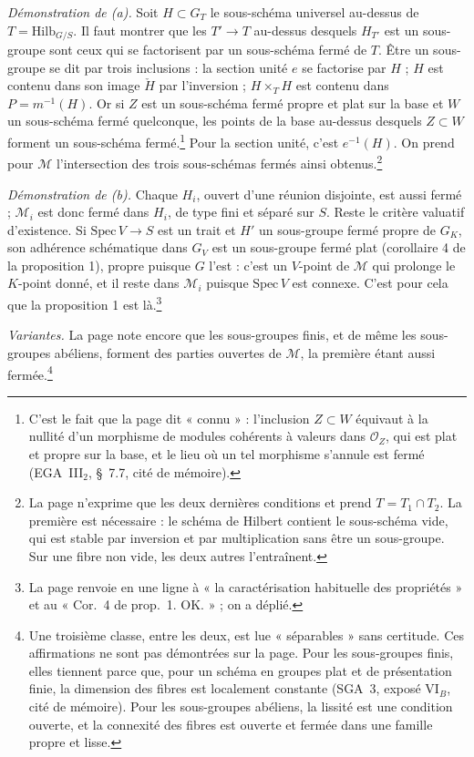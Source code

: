\documentclass[11pt,a4paper]{article}
\begin{document}
\emph{Démonstration de (a).} Soit $H \subset G_{T}$ le sous-schéma universel
au-dessus de $T = \mathrm{Hilb}_{G/S}$. Il faut montrer que les $T' \to T$ au-dessus
desquels $H_{T'}$ est un sous-groupe sont ceux qui se factorisent par un
sous-schéma fermé de $T$. Être un sous-groupe se dit par trois inclusions :
la section unité $e$ se factorise par $H$ ; $H$ est contenu dans son image
$\check{H}$ par l'inversion ; $H \times_T H$ est contenu dans
$P = m^{-1}(H)$. Or si $Z$ est un sous-schéma fermé propre et plat sur la base
et $W$ un sous-schéma fermé quelconque, les points de la base au-dessus
desquels $Z \subset W$ forment un sous-schéma fermé.\footnote{C'est le fait
que la page dit « connu » : l'inclusion $Z \subset W$ équivaut à la nullité
d'un morphisme de modules cohérents à valeurs dans $\mathcal{O}_Z$, qui est
plat et propre sur la base, et le lieu où un tel morphisme s'annule est fermé
(EGA~III$_{2}$, §~7.7, cité de mémoire).} Pour la section unité, c'est
$e^{-1}(H)$. On prend pour $\mathcal{M}$ l'intersection des trois sous-schémas
fermés ainsi obtenus.\footnote{La page n'exprime que les deux dernières
conditions et prend $T = T_1 \cap T_2$. La première est nécessaire : le
schéma de Hilbert contient le sous-schéma vide, qui est stable par inversion
et par multiplication sans être un sous-groupe. Sur une fibre non vide, les
deux autres l'entraînent.}

\emph{Démonstration de (b).} Chaque $H_i$, ouvert d'une réunion disjointe, est
aussi fermé ; $\mathcal{M}_i$ est donc fermé dans $H_i$, de type fini et
séparé sur $S$. Reste le critère valuatif d'existence. Si
$\mathrm{Spec}\, V \to S$ est un trait et $H'$ un sous-groupe fermé propre de
$G_K$, son adhérence schématique dans $G_V$ est un sous-groupe fermé plat
(corollaire 4 de la proposition 1), propre puisque $G$ l'est : c'est un
$V$-point de $\mathcal{M}$ qui prolonge le $K$-point donné, et il reste dans
$\mathcal{M}_i$ puisque $\mathrm{Spec}\, V$ est connexe. C'est pour cela
que la proposition 1 est là.\footnote{La page renvoie en une ligne à « la
caractérisation habituelle des propriétés » et au « Cor.~4 de prop.~1. OK. » ;
on a déplié.}

\emph{Variantes.} La page note encore que les sous-groupes finis, et de même
les sous-groupes abéliens, forment des parties ouvertes de $\mathcal{M}$, la
première étant aussi fermée.\footnote{Une troisième classe, entre les deux, est
lue « séparables » sans certitude. Ces affirmations ne sont pas démontrées sur
la page. Pour les sous-groupes finis, elles tiennent parce que, pour un
schéma en groupes plat et de présentation finie, la dimension des fibres est
localement constante (SGA~3, exposé VI$_{B}$, cité de mémoire). Pour les
sous-groupes abéliens, la lissité est une condition ouverte, et la connexité
des fibres est ouverte et fermée dans une famille propre et lisse.}
\end{document}
